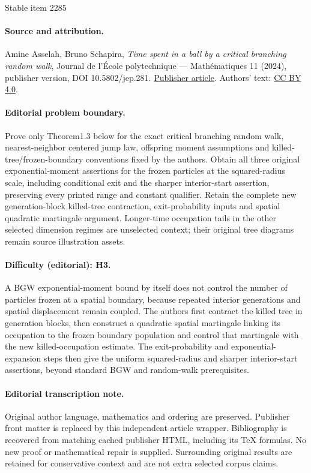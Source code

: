 \documentclass[11pt]{article}
\numberwithin{equation}{section}
\theoremstyle{plain}
\theoremstyle{definition}
\newcommand{\1}{{\text{\Large $\mathfrak 1$}}}
\begin{document}
\begin{center}{\Large Stable item 2285}\end{center}
\paragraph{Source and attribution.}
Amine Asselah, Bruno Schapira, \emph{Time spent in a ball by a critical branching random walk}, Journal de l’École polytechnique — Mathématiques 11 (2024), publisher version, DOI 10.5802/jep.281. \href{https://jep.centre-mersenne.org/articles/10.5802/jep.281/}{Publisher article}. Authors' text: \href{https://creativecommons.org/licenses/by/4.0/}{CC BY 4.0}.
\paragraph{Editorial problem boundary.}
Prove only Theorem1.3 below for the exact critical branching random walk, nearest-neighbor centered jump law, offspring moment assumptions and killed-tree/frozen-boundary conventions fixed by the authors. Obtain all three original exponential-moment assertions for the frozen particles at the squared-radius scale, including conditional exit and the sharper interior-start assertion, preserving every printed range and constant qualifier. Retain the complete new generation-block killed-tree contraction, exit-probability inputs and spatial quadratic martingale argument. Longer-time occupation tails in the other selected dimension regimes are unselected context; their original tree diagrams remain source illustration assets.
\paragraph{Difficulty (editorial): H3.}
A BGW exponential-moment bound by itself does not control the number of particles frozen at a spatial boundary, because repeated interior generations and spatial displacement remain coupled. The authors first contract the killed tree in generation blocks, then construct a quadratic spatial martingale linking its occupation to the frozen boundary population and control that martingale with the new killed-occupation estimate. The exit-probability and exponential-expansion steps then give the uniform squared-radius and sharper interior-start assertions, beyond standard BGW and random-walk prerequisites.
\paragraph{Editorial transcription note.}
Original author language, mathematics and ordering are preserved. Publisher front matter is replaced by this independent article wrapper. Bibliography is recovered from matching cached publisher HTML, including its TeX formulas. No new proof or mathematical repair is supplied. Surrounding original results are retained for conservative context and are not extra selected corpus claims.
\clearpage
\end{document}
